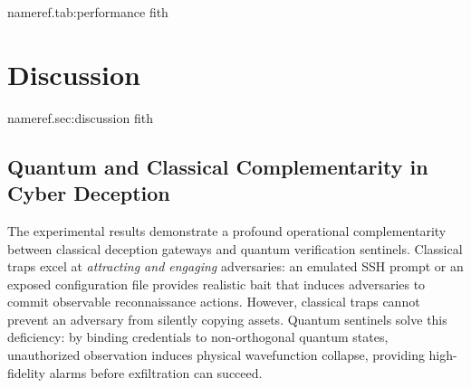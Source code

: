 \documentclass[journal,10pt]{IEEEtran}
\makeatletter
\let\orig@label\label
\def\label#1{%
  \orig@label{#1}%
  \pdfdest name{ref.#1} fith\relax
}
\makeatother
\begin{document}
\begin{table}[!t]
\centering
\caption{Comprehensive Performance and Detection Evaluation Metrics}
\label{tab:performance}
\end{table}

\section{Discussion}\label{sec:discussion}

\subsection{Quantum and Classical Complementarity in Cyber Deception}
The experimental results demonstrate a profound operational complementarity between classical deception gateways and quantum verification sentinels. Classical traps excel at \emph{attracting and engaging} adversaries: an emulated SSH prompt or an exposed configuration file provides realistic bait that induces adversaries to commit observable reconnaissance actions. However, classical traps cannot prevent an adversary from silently copying assets. Quantum sentinels solve this deficiency: by binding credentials to non-orthogonal quantum states, unauthorized observation induces physical wavefunction collapse, providing high-fidelity alarms before exfiltration can succeed.
\end{document}
